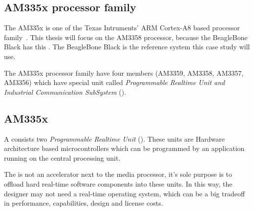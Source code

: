 \subsection{AM335x processor family}

The AM335x is one of the Texas Intruments' ARM Cortex-A8 based processor family~\citep{AM335x}. This thesis will focus on the AM3358 processor, because the BeagleBone Black \citep{BBB} has this \cpu. The BeagleBone Black is the reference system this case study will use.

The AM335x processor family have four members (AM3359, AM3358, AM3357, AM3356) which have special unit called \emph{Programmable Realtime Unit and Industrial Communication SubSystem} (\pruss).

\subsection{AM335x \pruss}

A \pruss{} consists two \emph{Programmable Realtime Unit} (\pru). These units are Hardware architecture based microcontrollers which can be programmed by an application running on the central processing unit.

The \pru{} is not an accelerator next to the media processor, it's sole purpose is to offload hard real-time software components into these units. In this way, the designer may not need a real-time operating system, which can be a big tradeoff in performance, capabilities, design and license costs.

